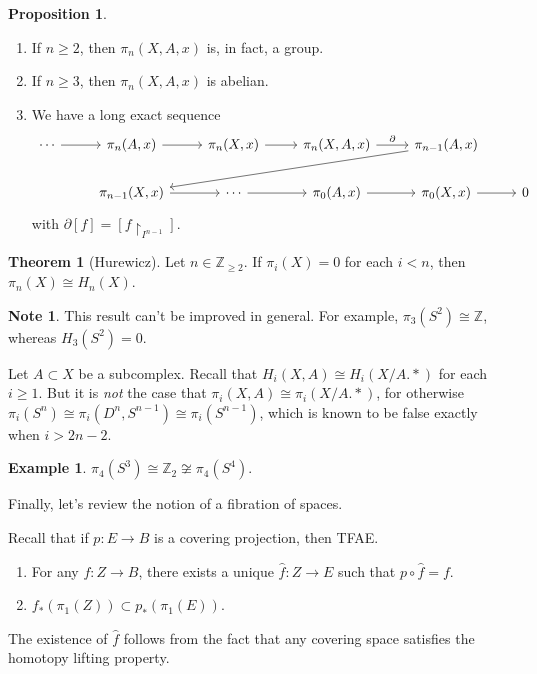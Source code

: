 \documentclass[10pt,letterpaper,cm]{nupset}
\theoremstyle{definition}
\newtheorem{exmp}[defn]{Example}
\newtheorem{note}[defn]{Note}
\theoremstyle{theorem}
\newtheorem{theorem}[defn]{Theorem}
\newtheorem{prop}[defn]{Proposition}
\theoremstyle{remark}
\newcommand{\Z}{\mathbb Z}
\newcommand{\1}{\mathbb{1}}
\newcommand{\0}{\vec 0}
\newcommand{\be}{\begin{enumerate}}
\newcommand{\ee}{\end{enumerate}}
\begin{document}
\begin{prop} $ $
\be
\item If $n\geq 2$, then $\pi_n(X, A, x)$ is, in fact, a group.
\item If $n\geq 3$, then $\pi_n(X, A, x)$ is abelian.
\item We have a long exact sequence 
\[
\begin{tikzcd}
\cdots \arrow[r] & {\pi_n(A,x)} \arrow[r]     & {\pi_n(X, x)} \arrow[r] & {\pi_n(X, A, x)} \arrow[r, "\partial"] & {\pi_{n-1}(A,x)} \arrow[llld] &   \\
                 & {\pi_{n-1}(X,x)} \arrow[r] & \cdots \arrow[r]        & {\pi_0(A, x)} \arrow[r]                & {\pi_0(X,x)} \arrow[r]        & 0
\end{tikzcd}
\] with $\partial{[f]} = \left[f\restriction_{I^{n-1}}\right]$.
\ee 
\end{prop}

\begin{theorem}[Hurewicz] 
Let $n\in \Z_{\geq 2}$. If $\pi_i(X) =0$ for each $i < n$, then $\pi_n(X) \cong H_n(X)$. 
\end{theorem}

\begin{note}
This result can't be improved in general. For example, $\pi_3(S^2) \cong \Z$, whereas $H_3(S^2) =0$.
\end{note}

Let $A \subset X$ be a subcomplex. Recall that $H_i(X, A) \cong H_i(X/A. \ast)$ for each $i\geq 1$. But it is \emph{not} the case that $\pi_i(X, A) \cong \pi_i(X/A. \ast)$, for otherwise  $\pi_i(S^n) \cong \pi_i(D^n, S^{n-1}) \cong \pi_i(S^{n-1})$, which is known to be false exactly when $i > 2n-2$. 

\begin{exmp}
$\pi_4(S^3) \cong \Z_2 \not \cong  \pi_4(S^4)$.
\end{exmp}

\bigskip

Finally, let's review the notion of a fibration of spaces.

\medskip

Recall that if $p: E \to B$ is a covering projection, then TFAE.
\be
\item For any $f: Z \to B$, there exists a unique $\hat{f} :Z \to E$ such that $p \circ \hat{f} = f$.
\item $f_{\ast}(\pi_1(Z)) \subset p_{\ast}(\pi_1(E))$.
\ee

The existence of $\hat{f}$ follows from the fact that any covering space satisfies the homotopy lifting property.
\end{document}
